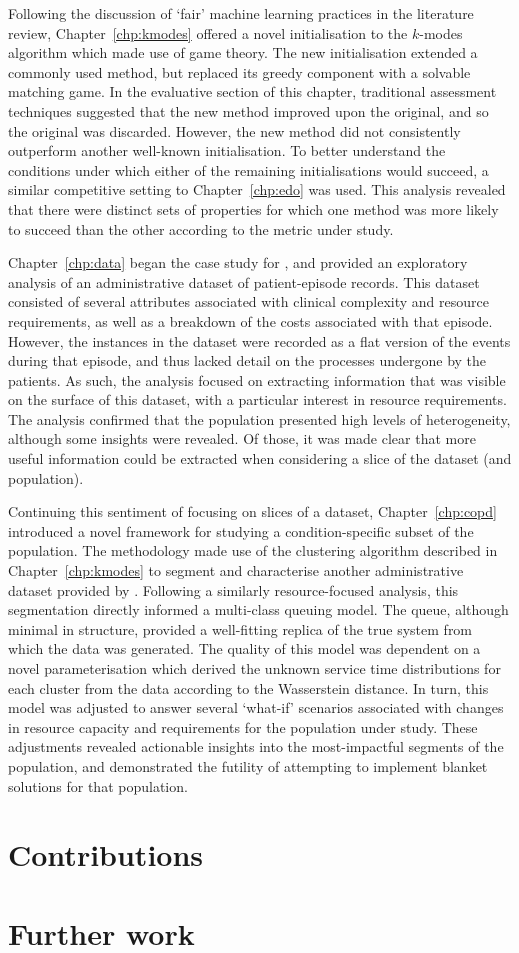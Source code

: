 Following the discussion of `fair' machine learning practices in the literature
review, Chapter~\ref{chp:kmodes} offered a novel initialisation to the
\(k\)-modes algorithm which made use of game theory. The new initialisation
extended a commonly used method, but replaced its greedy component with a
solvable matching game. In the evaluative section of this chapter, traditional
assessment techniques suggested that the new method improved upon the original,
and so the original was discarded. However, the new method did not consistently
outperform another well-known initialisation. To better understand the
conditions under which either of the remaining initialisations would succeed, a
similar competitive setting to Chapter~\ref{chp:edo} was used. This analysis
revealed that there were distinct sets of properties for which one method was
more likely to succeed than the other according to the metric under study.

Chapter~\ref{chp:data} began the case study for \ctmuhb, and provided an
exploratory analysis of an administrative dataset of patient-episode records.
This dataset consisted of several attributes associated with clinical complexity
and resource requirements, as well as a breakdown of the costs associated with
that episode. However, the instances in the dataset were recorded as a flat
version of the events during that episode, and thus lacked detail on the
processes undergone by the patients. As such, the analysis focused on extracting
information that was visible on the surface of this dataset, with a particular
interest in resource requirements. The analysis confirmed that the population
presented high levels of heterogeneity, although some insights were revealed. Of
those, it was made clear that more useful information could be extracted when
considering a slice of the dataset (and population).

Continuing this sentiment of focusing on slices of a dataset,
Chapter~\ref{chp:copd} introduced a novel framework for studying a
condition-specific subset of the population. The methodology made use of the
clustering algorithm described in Chapter~\ref{chp:kmodes} to segment and
characterise another administrative dataset provided by \ctmuhb. Following a
similarly resource-focused analysis, this segmentation directly informed a
multi-class queuing model. The queue, although minimal in structure, provided a
well-fitting replica of the true system from which the data was generated. The
quality of this model was dependent on a novel parameterisation which derived
the unknown service time distributions for each cluster from the data according
to the Wasserstein distance. In turn, this model was adjusted to answer several
`what-if' scenarios associated with changes in resource capacity and
requirements for the population under study. These adjustments revealed
actionable insights into the most-impactful segments of the population, and
demonstrated the futility of attempting to implement blanket solutions for that
population.

\section{Contributions}



\section{Further work}
